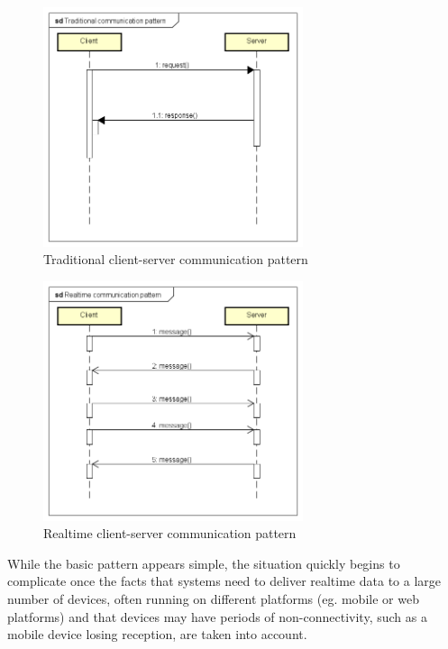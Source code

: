 \begin{figure}[H]
	\centering
	\includegraphics[width=0.68\textwidth]{figures/02_analysis/Traditional-communication-pattern}
    \caption{Traditional client-server communication pattern}
    \label{fig:traditional-communication}
\end{figure}

\begin{figure}[H]
	\centering
	\includegraphics[width=0.68\textwidth]{figures/02_analysis/Realtime-communication-pattern}
    \caption{Realtime client-server communication pattern}
    \label{fig:realtime-communication-pattern}
\end{figure}

While the basic pattern appears simple, the situation quickly begins to complicate once the facts that systems need to deliver realtime data to a large number of devices, often running on different platforms (eg. mobile or web platforms) and that devices may have periods of non-connectivity, such as a mobile device losing reception, are taken into account.

